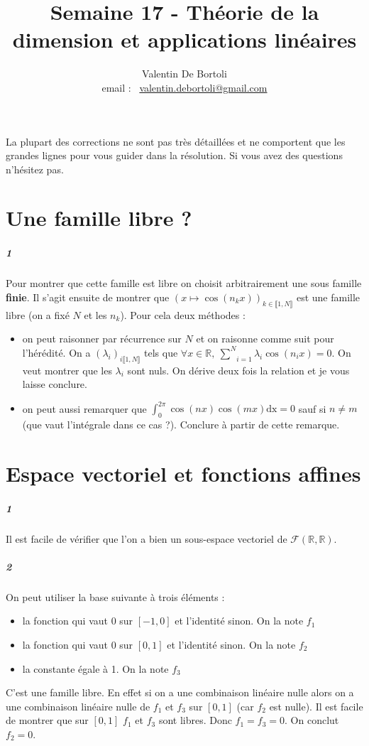 \documentclass[10pt,a4paper]{article}
\title{Semaine 17 - Théorie de la dimension et applications linéaires}
\author{Valentin De Bortoli \\ email : \ \href{mailto:valentin.debortoli@gmail.com}{valentin.debortoli@gmail.com}}
\date{}
\begin{document}
\maketitle
La plupart des corrections ne sont pas très détaillées et ne comportent que les grandes lignes pour vous guider dans la résolution. Si vous avez des questions n'hésitez pas.

\section{Une famille libre ?}
\subparagraph{1} Pour montrer que cette famille est libre on choisit arbitrairement une sous famille \textbf{finie}. Il s'agit ensuite de montrer que $(x \mapsto \cos(n_k x))_{k \in \llbracket 1,N \rrbracket}$ est une famille libre (on a fixé $N$ et les $n_k$). Pour cela deux méthodes :
\begin{itemize}
\item on peut raisonner par récurrence sur $N$ et on raisonne comme suit pour l'hérédité. On a $(\lambda_i)_{i \llbracket 1,N \rrbracket}$ tels que $\forall x \in \mathbb{R},\ \underset{i=1}{\overset{N}{\sum}} \lambda_i \cos(n_i x) =0$. On veut montrer que les $\lambda_i$ sont nuls. On dérive deux fois la relation et je vous laisse conclure.
\item on peut aussi remarquer que $\int_0^{2 \pi} \cos(nx)\cos(mx) \text{dx}=0$ sauf si $n \neq m$ (que vaut l'intégrale dans ce cas ?). Conclure à partir de cette remarque.
\end{itemize}

\section{Espace vectoriel et fonctions affines}
\subparagraph{1}Il est facile de vérifier que l'on a bien un sous-espace vectoriel de $\mathcal{F}(\mathbb{R},\mathbb{R})$.
\subparagraph{2}On peut utiliser la base suivante à trois éléments :
\begin{itemize}
\item la fonction qui vaut $0$ sur $[-1,0]$ et l'identité sinon. On la note $f_1$
\item la fonction qui vaut $0$ sur $[0,1]$ et l'identité sinon. On la note $f_2$
\item la constante égale à 1. On la note $f_3$
\end{itemize} 
C'est une famille libre. En effet si on a une combinaison linéaire nulle alors on a une combinaison linéaire nulle de $f_1$ et $f_3$ sur $[0,1]$ (car $f_2$ est nulle). Il est facile de montrer que sur $[0,1]$ $f_1$ et $f_3$ sont libres. Donc $f_1=f_3=0$. On conclut $f_2=0$.
\end{document}
